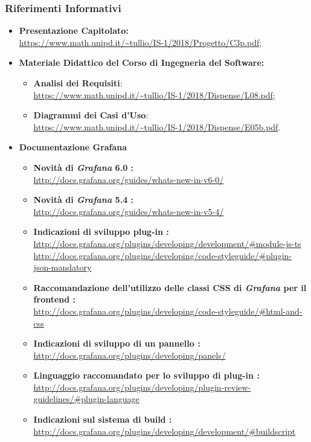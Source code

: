 \subsubsection{Riferimenti Informativi}
\begin{itemize}
\item \textbf{Presentazione Capitolato:}\\ \url{https://www.math.unipd.it/~tullio/IS-1/2018/Progetto/C3p.pdf};
\item \textbf{Materiale Didattico del Corso di Ingegneria del Software:}
	\begin{itemize}
	\item \textbf{Analisi dei Requisiti}:\\ \url{https://www.math.unipd.it/~tullio/IS-1/2018/Dispense/L08.pdf};
	\item \textbf{Diagrammi dei Casi d'Uso}:\\ \url{https://www.math.unipd.it/~tullio/IS-1/2018/Dispense/E05b.pdf}.
	\end{itemize}
\item \textbf{Documentazione Grafana}
	\begin{itemize}
		\item \textbf{Novità di \textit{Grafana} 6.0 :} \\ \url{http://docs.grafana.org/guides/whats-new-in-v6-0/}
		\item \textbf{Novità di \textit{Grafana} 5.4 :}\\ \url{http://docs.grafana.org/guides/whats-new-in-v5-4/}
		\item \textbf{Indicazioni di sviluppo plug-in :} \\
		\url{http://docs.grafana.org/plugins/developing/development/#module-js-ts}\\
		\url{http://docs.grafana.org/plugins/developing/code-styleguide/#plugin-json-mandatory}
		\item \textbf{Raccomandazione dell'utilizzo delle classi CSS di \textit{Grafana} per il frontend :} \\
		\url{http://docs.grafana.org/plugins/developing/code-styleguide/#html-and-css}
		\item \textbf{Indicazioni di sviluppo di un pannello :}\\
		\url{http://docs.grafana.org/plugins/developing/panels/}
		\item \textbf{Linguaggio raccomandato per lo sviluppo di plug-in :}\\ \url{http://docs.grafana.org/plugins/developing/plugin-review-guidelines/#plugin-language}
		\item \textbf{Indicazioni sul sistema di build :}\\
		 \url{http://docs.grafana.org/plugins/developing/development/#buildscript}
	\end{itemize}
\end{itemize}
